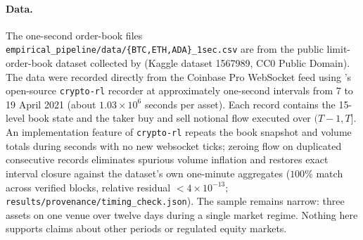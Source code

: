 \documentclass[10pt,twocolumn,letterpaper]{article}
\theoremstyle{definition}
\theoremstyle{remark}
\begin{document}
\paragraph{Data.} The one-second order-book files \texttt{empirical\_pipeline/data/\{BTC,ETH,ADA\}\_1sec.csv} are from the public limit-order-book dataset collected by \citet{nielsen2021} (Kaggle dataset 1567989, CC0 Public Domain). The data were recorded directly from the Coinbase Pro WebSocket feed using \citeauthor{sadighian2019}'s open-source \texttt{crypto-rl} recorder at approximately one-second intervals from 7 to 19 April 2021 (about $1.03\times10^6$ seconds per asset). Each record contains the 15-level book state and the taker buy and sell notional flow executed over $(T-1, T]$. An implementation feature of \texttt{crypto-rl} repeats the book snapshot and volume totals during seconds with no new websocket ticks; zeroing flow on duplicated consecutive records eliminates spurious volume inflation and restores exact interval closure against the dataset's own one-minute aggregates ($100\%$ match across verified blocks, relative residual $< 4\times 10^{-13}$; \texttt{results/provenance/timing\_check.json}). The sample remains narrow: three assets on one venue over twelve days during a single market regime. Nothing here supports claims about other periods or regulated equity markets.
\end{document}
